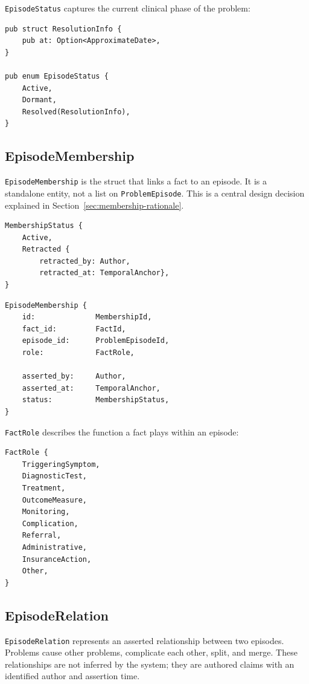 \documentclass[11pt]{article}
\begin{document}
\texttt{EpisodeStatus} captures the current clinical phase of the problem:

\begin{lstlisting}
pub struct ResolutionInfo {
    pub at: Option<ApproximateDate>,
}

pub enum EpisodeStatus {
    Active,
    Dormant,
    Resolved(ResolutionInfo),
}
\end{lstlisting}

\subsection{EpisodeMembership}

\texttt{EpisodeMembership} is the struct that links a fact to an episode. It
is a standalone entity, not a list on \texttt{ProblemEpisode}. This is a
central design decision explained in Section~\ref{sec:membership-rationale}.

\begin{lstlisting}
MembershipStatus {
    Active,
    Retracted {
        retracted_by: Author,
        retracted_at: TemporalAnchor},
}
\end{lstlisting}

\begin{lstlisting}
EpisodeMembership {
    id:              MembershipId,
    fact_id:         FactId,
    episode_id:      ProblemEpisodeId,
    role:            FactRole,

    asserted_by:     Author,
    asserted_at:     TemporalAnchor,
    status:          MembershipStatus,
}
\end{lstlisting}

\texttt{FactRole} describes the function a fact plays within an episode:

\begin{lstlisting}
FactRole {
    TriggeringSymptom,
    DiagnosticTest,
    Treatment,
    OutcomeMeasure,
    Monitoring,
    Complication,
    Referral,
    Administrative,
    InsuranceAction,
    Other,
}
\end{lstlisting}



\subsection{EpisodeRelation}

\texttt{EpisodeRelation} represents an asserted relationship between two
episodes. Problems cause other problems, complicate each other, split,
and merge. These relationships are not inferred by the system; they are
authored claims with an identified author and assertion time.
\end{document}
